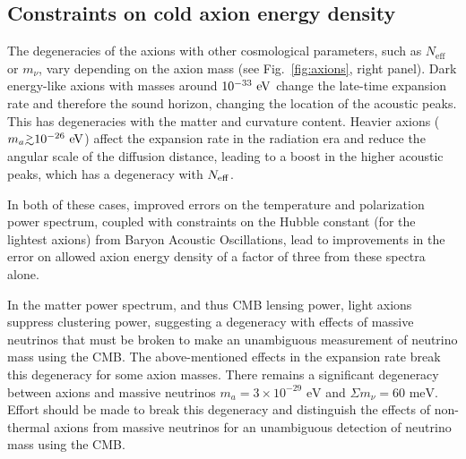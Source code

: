 \subsection{Constraints on cold axion energy density}

The degeneracies of the axions with other cosmological parameters, such as $N_\mathrm{eff}$ or $m_\nu$, vary depending on the axion mass (see Fig.~\ref{fig:axions}, right panel). Dark energy-like axions with masses around $10^{-33}~{\rm eV}$ change the late-time expansion rate and therefore the sound horizon, changing the location of the acoustic peaks. This has degeneracies with the matter and curvature content. 
Heavier axions ($m_a \gtrsim 10^{-26}~{\rm eV}$) affect the expansion rate in the radiation era and reduce the angular scale of the diffusion distance, leading to a boost in the higher acoustic peaks, which has a degeneracy with $N_{\rm eff}$. 

In both of these cases, improved errors on the temperature and polarization power spectrum, coupled with constraints on the Hubble constant (for the lightest axions) from Baryon Acoustic Oscillations, lead to improvements in the error on allowed axion energy density of a factor of three from these spectra alone. 

In the matter power spectrum, and thus CMB lensing power, light axions suppress clustering power, suggesting a degeneracy with effects of massive neutrinos that must be broken to make an unambiguous measurement of neutrino mass using the CMB. The above-mentioned effects in the expansion rate break this degeneracy for some axion masses. There remains a significant degeneracy between axions and massive neutrinos $m_a=3\times 10^{-29}\text{ eV}$ and $\Sigma m_\nu=60\text{ meV}$. Effort should be made to break this degeneracy and distinguish the effects of non-thermal axions from massive neutrinos for an unambiguous detection of neutrino mass using the CMB. 

